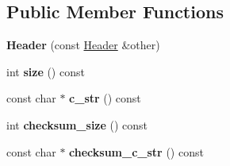 \subsection*{Public Member Functions}
\begin{DoxyCompactItemize}
\item 
{\bfseries Header} (const \hyperlink{structip_1_1Header}{Header} \&other)\hypertarget{structip_1_1Header_a5e6285562e806c49a9c2f015e7400460}{}\label{structip_1_1Header_a5e6285562e806c49a9c2f015e7400460}

\item 
int {\bfseries size} () const \hypertarget{structip_1_1Header_ae426f14cf9842f7392c853463cf396da}{}\label{structip_1_1Header_ae426f14cf9842f7392c853463cf396da}

\item 
const char $\ast$ {\bfseries c\+\_\+str} () const \hypertarget{structip_1_1Header_aedc814b0cc79df651dc869d721f32b83}{}\label{structip_1_1Header_aedc814b0cc79df651dc869d721f32b83}

\item 
int {\bfseries checksum\+\_\+size} () const \hypertarget{structip_1_1Header_ae9467c8f725af565e43fb9210ad9a943}{}\label{structip_1_1Header_ae9467c8f725af565e43fb9210ad9a943}

\item 
const char $\ast$ {\bfseries checksum\+\_\+c\+\_\+str} () const \hypertarget{structip_1_1Header_a32100da1e12b3a6a8aca71d665c7a2e9}{}\label{structip_1_1Header_a32100da1e12b3a6a8aca71d665c7a2e9}

\end{DoxyCompactItemize}
